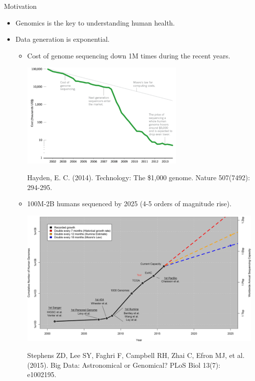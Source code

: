 \documentclass{beamer}
\begin{document}
\begin{frame}[fragile]
\begin{columns}[T]
\begin{column}{.32\textwidth}
\begin{block}{Motivation\hfill{}}
\begin{itemize}
\item Genomics is the key to understanding human health.
\item Data generation is exponential.
	\begin{itemize}
	\item Cost of genome sequencing down 1M times during the recent years.
	\begin{center}
	\includegraphics[height=14em,width=\linewidth]{img/sequencing.png}
	\vspace{-2mm}
	\end{center}
	\begin{flushright}
	\footnotesize Hayden, E. C. (2014). Technology: The \$1,000 genome. Nature 507(7492): 294-295.	
	\end{flushright}
	\item \small 100M-2B humans sequenced by 2025 (4-5 orders of magnitude rise).
	\begin{center}
	\includegraphics[width=\linewidth]{img/growth.png}
	\vspace{-2mm}
	\end{center}
	\begin{flushright}
	\footnotesize Stephens ZD, Lee SY, Faghri F, Campbell RH, Zhai C, Efron MJ, et al. (2015). Big Data: Astronomical or Genomical? PLoS Biol 13(7): e1002195.

\end{flushright}
\end{itemize}
\end{itemize}
\end{block}
\end{column}
\end{columns}
\end{frame}
\end{document}
